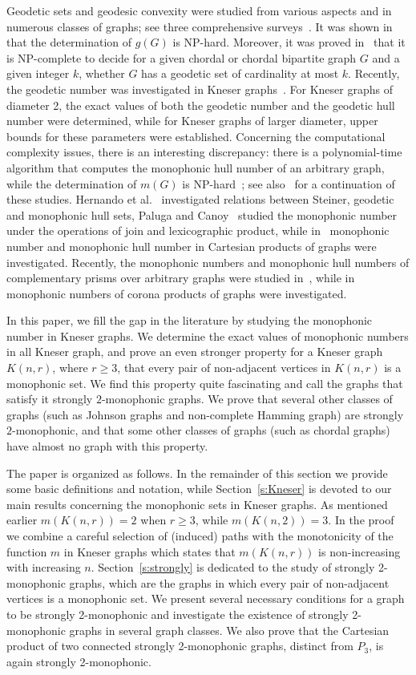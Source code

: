 \documentclass[a4paper,11pt]{article}
\begin{document}
Geodetic sets and geodesic convexity were studied from various aspects and in numerous classes of graphs; see three comprehensive surveys~\cite{BKT-chapter,cpz,Pela}. 
It was shown in~\cite{Ataci2002} that the determination of $g(G)$ is NP-hard. Moreover, it was proved in~\cite{Do2010} that it is NP-complete to decide for a given chordal or chordal bipartite graph $G$ and a given 
integer $k$, whether $G$ has a geodetic set of cardinality at most $k$.
Recently, the geodetic number was investigated in Kneser graphs~\cite{BEDO2023127964}. For Kneser graphs of diameter 2, the exact values of both the geodetic number and the geodetic hull number were determined, while for Kneser graphs of larger diameter, upper bounds for these parameters were established. 
Concerning the computational complexity issues, there is an interesting discrepancy: there is a polynomial-time algorithm that computes the monophonic hull number of an arbitrary graph, while the determination of $m(G)$ is NP-hard~\cite{DPS}; see also~\cite{CDS} for a continuation of these studies. Hernando et al.~\cite{HJM} investigated relations between Steiner, geodetic and monophonic hull sets, Paluga and Canoy~\cite{PC} studied the monophonic number under the operations of join and lexicographic product, while in~\cite{pal,sancha} monophonic number and monophonic hull number in Cartesian products of graphs were investigated. Recently, the monophonic numbers and monophonic hull numbers of complementary prisms over arbitrary graphs were studied in~\cite{NCN}, while in~\cite{GS} monophonic numbers of corona products of graphs were investigated. 

In this paper, we fill the gap in the literature by studying the monophonic number in Kneser graphs. We determine the exact values of monophonic numbers in all Kneser graph, and prove an even stronger property for a Kneser graph $K(n,r)$, where $r\ge 3$, that every pair of non-adjacent vertices in $K(n,r)$ is a monophonic set. We find this property quite fascinating and call the graphs that satisfy it strongly $2$-monophonic graphs. We prove that several other classes of graphs (such as Johnson graphs and non-complete Hamming graph) are strongly $2$-monophonic, and that some other classes of graphs (such as chordal graphs) have almost no graph with this property. 

The paper is organized as follows. In the remainder of this section we provide some basic definitions and notation, while Section~\ref{s:Kneser} is devoted to our main results concerning the monophonic sets in Kneser graphs. As mentioned earlier $m(K(n,r))=2$ when $r\ge 3$, while $m(K(n,2))=3$. In the proof we combine a careful selection of (induced) paths with the monotonicity of the function $m$ in Kneser graphs which states that $m(K(n,r))$ is non-increasing with increasing $n$.
Section~\ref{s:strongly} is dedicated to the study of strongly 2-monophonic graphs, which are the graphs in which every pair of non-adjacent vertices is a monophonic set. We present several necessary conditions for a graph to be strongly 2-monophonic and investigate the existence of strongly 2-monophonic graphs in several graph classes. We also prove that the Cartesian product of two connected strongly 2-monophonic graphs, distinct from $P_3$, is again strongly 2-monophonic.   
\end{document}
